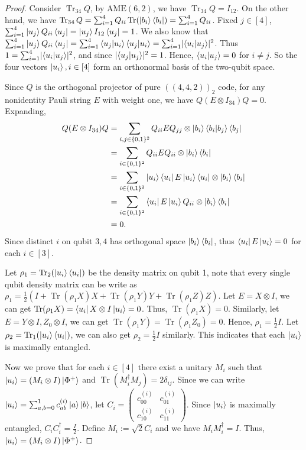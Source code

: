 \begin{proof}
    Consider $\operatorname{Tr}_{34}Q$, by $\mathrm{AME}(6,2)$, we have $\operatorname{Tr}_{34}Q=I_{12}$. On the other hand, we have $\operatorname{Tr}_{34}Q=\sum_{i=1}^4Q_{ii} \operatorname{Tr}(\ket{b_i}\bra{b_i})=\sum_{i=1}^4 Q_{ii}$. Fixed $j\in [4]$, $\sum_{i=1}^4\ket{u_j}Q_{ii}\bra{u_j}=\ket{u_j}I_{12}\bra{u_j}=1$. We also know that $\sum_{i=1}^4\ket{u_j}Q_{ii}\bra{u_j}=\sum_{i=1}^4\braket{u_j|u_i}\braket{u_j|u_i}=\sum_{i=1}^4\lvert \braket{u_i|u_j}\rvert^2$. Thus $1=\sum_{i=1}^4\lvert \braket{u_i|u_j}\rvert^2$, and since $\lvert \braket{u_j|u_j}\rvert^2=1$. Hence, $\braket{u_i|u_j}=0$ for $i\neq j$. So the four vectors $\ket{u_i},i\in[4]$ form an orthonormal basis of the two-qubit space.

    Since $Q$ is the orthogonal projector of pure $((4,4,2))_2$ code, for any nonidentity Pauli string $E$ with weight one, we have $Q(E\otimes I_{34})Q=0$. Expanding, 
    \begin{align}
        Q(E\otimes I_{34})Q&=\sum_{i,j\in\{0,1\}^2}Q_{ii}EQ_{jj}\otimes \ket{b_i}\braket{b_i|b_j}\bra{b_j}\\
        &=\sum_{i\in\{0,1\}^2}Q_{ii}EQ_{ii}\otimes\ket{b_i}\bra{b_i}\\
        &=\sum_{i\in\{0,1\}^2}\ket{u_i}\bra{u_i}E\ket{u_i}\bra{u_i}\otimes \ket{b_i}\bra{b_i}\\
        &=\sum_{i\in\{0,1\}^2}\bra{u_i}E\ket{u_i}Q_{ii}\otimes \ket{b_i}\bra{b_i}\\
        &=0.
    \end{align}
    Since distinct $i$ on qubit $3,4$ has orthogonal space $\ket{b_i}\bra{b_i}$, thus $\bra{u_i}E\ket{u_i}=0$ for each $i\in [3]$.

    Let $\rho_1=\operatorname{Tr}_2(\ket{u_i}\bra{u_i})$ be the density matrix on qubit 1, note that every single qubit density matrix can be write as $\rho_1=\frac{1}{2}(I+\operatorname{Tr}(\rho_1X)X+\operatorname{Tr}(\rho_1Y)Y+\operatorname{Tr}(\rho_1Z)Z)$. Let $E=X\otimes I$, we can get $\operatorname{Tr}(\rho_1X)=\bra{u_i}X\otimes I\ket{u_i}=0$. Thus, $\operatorname{Tr}(\rho_1X)=0$. Similarly, let $E=Y\otimes I,Z_0\otimes I$, we can get $\operatorname{Tr}(\rho_1Y)=\operatorname{Tr}(\rho_1Z_0)=0$. Hence, $\rho_1=\frac{1}{2}I$. Let $\rho_2=\operatorname{Tr}_1(\ket{u_i}\bra{u_i})$, we can also get $\rho_2=\frac{1}{2}I$ similarly. This indicates that each $\ket{u_i}$ is maximally entangled.

    Now we prove that for each $i\in [4]$ there exist a unitary $M_i$ such that $\ket{u_i}=(M_i\otimes I)\ket{\Phi^+}$ and $\operatorname{Tr}(M_i^\dagger M_j)=2\delta_{ij}$. Since we can write $\ket{u_i}=\sum_{a,b=0}^1c_{ab}^{(i)}\ket{a}\ket{b}$, let $C_i=\left(\begin{matrix}
        c_{00}^{(i)} & c_{01}^{(i)}\\
        c_{10}^{(i)} & c_{11}^{(i)}
    \end{matrix}\right)$. Since $\ket{u_i}$ is maximally entangled, $C_iC_i^\dagger=\frac{I}{2}$. Define $M_i:=\sqrt{2} C_i$ and we have $M_iM_i^\dagger=I$. Thus, $\ket{u_i}=(M_i\otimes I)\ket{\Phi^+}$.


\end{proof}
